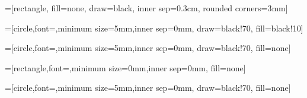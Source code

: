 \usepackage{xspace}
\usepackage{tikz}
\usetikzlibrary{backgrounds}
\usepackage{amsmath}
\usepackage{algorithmic}

\newcommand*{\given}{\vert}
\newcommand{\Prob}[1]{\mathrm{P}(#1)}
\newcommand{\data}{\mathcal{D}}
\newcommand{\hdptm}{\textsc{hdptm}\xspace}
\newcommand{\bnc}{\textsc{bnc}\xspace}
\newcommand{\tfidf}{\textsc{tf-idf}\xspace}
\newcommand{\bic}{\textsc{bic}\xspace}
\newcommand{\textj}[1]{t_#1}
\newcommand{\dcat}[1]{\mathrm{Categorical}(#1)}
\newcommand{\ddirich}[1]{\mathrm{Dirichlet}(#1)}
\newcommand{\ddp}[1]{\mathrm{DirichletProcess}(#1)}
\newcommand{\dstick}[1]{\mathrm{StickBreaking}(#1)}
\newcommand{\dgamma}[1]{\mathrm{Gamma}(#1)}
\newcommand{\waic}{\textsc{waic}\xspace}
\newcommand{\dwaic}{\Delta^\waic}
\newcommand{\dwaicse}{\Delta^\waic_{\text{\textsc{se}}}}
\newcommand{\psimodel}[1]{\psi^{\text{#1}}}
\newcommand{\Probc}[1]{\mathrm{P}_{\text{\!\tiny \textsc{c}}}( #1 )}
\newcommand{\Proba}[1]{\mathrm{P}_{\text{\!\tiny \textsc{a}}}( #1 )}
\newcommand{\drm}{\textsc{drm}\xspace}
\newcommand{\psibayes}{\psimodel{Bayesian}}
\newcommand{\psicooccur}{\psimodel{Cooccurrence}}
\newcommand{\psiassoc}{\psimodel{Associative}}

\usepackage{caption}
\usepackage{subcaption}

\usepackage{tikz}
\usetikzlibrary{backgrounds}


\RequirePackage{tikz}
\usetikzlibrary{trees}
\usetikzlibrary{matrix}

\usetikzlibrary{decorations.pathmorphing} %
\usetikzlibrary{fit}					%
\usetikzlibrary{backgrounds}	%
\usetikzlibrary{matrix}

=[rectangle, fill=none,
						draw=black,
                                                inner sep=0.3cm,
                                                rounded corners=3mm]

=[circle,font=\small,minimum size=5mm,inner sep=0mm,
                                    draw=black!70,
                                    fill=black!10]

=[circle,font=\small,minimum size=5mm,inner sep=0mm,
                                   draw=black!70,
                                    fill=none]

=[rectangle,font=\small,minimum size=0mm,inner sep=0mm,
                                    fill=none]

=[circle,font=\small,minimum size=5mm,inner sep=0mm,
                                   draw=black!70,
                                    fill=none]

